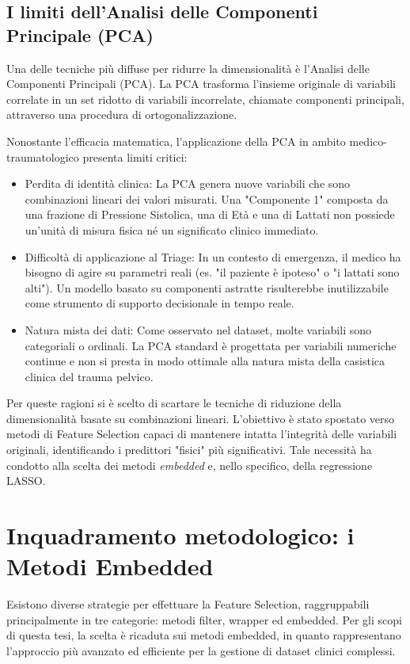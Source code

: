 \documentclass[11pt, oneside, noexaminfo]{sapthesis}   	%
\begin{document}
\subsection{I limiti dell'Analisi delle Componenti Principale (PCA)}
Una delle tecniche più diffuse per ridurre la dimensionalità è l'Analisi delle Componenti Principali (PCA). La PCA trasforma l'insieme originale di variabili correlate in un set ridotto di variabili incorrelate, chiamate componenti principali, attraverso una procedura di ortogonalizzazione.

Nonostante l'efficacia matematica, l'applicazione della PCA in ambito medico-traumatologico presenta limiti critici:
\begin{itemize}
\item {Perdita di identità clinica}: La PCA genera nuove variabili che sono combinazioni lineari dei valori misurati. Una "Componente 1" composta da una frazione di Pressione Sistolica, una di Età e una di Lattati non possiede un'unità di misura fisica né un significato clinico immediato.
\item {Difficoltà di applicazione al Triage}: In un contesto di emergenza, il medico ha bisogno di agire su parametri reali (es. "il paziente è ipoteso" o "i lattati sono alti"). Un modello basato su componenti astratte risulterebbe inutilizzabile come strumento di supporto decisionale in tempo reale.
\item {Natura mista dei dati}: Come osservato nel dataset, molte variabili sono categoriali o ordinali. La PCA standard è progettata per variabili numeriche continue e non si presta in modo ottimale alla natura mista della casistica clinica del trauma pelvico.
\end{itemize}

Per queste ragioni si è scelto di scartare le tecniche di riduzione della dimensionalità basate su combinazioni lineari. L'obiettivo è stato spostato verso metodi di Feature Selection capaci di mantenere intatta l'integrità delle variabili originali, identificando i predittori "fisici" più significativi. Tale necessità ha condotto alla scelta dei metodi \textit{embedded} e, nello specifico, della regressione LASSO.

\section{Inquadramento metodologico: i Metodi Embedded}
Esistono diverse strategie per effettuare la Feature Selection, raggruppabili principalmente in tre categorie: metodi filter, wrapper ed embedded. Per gli scopi di questa tesi, la scelta è ricaduta sui metodi embedded, in quanto rappresentano l'approccio più avanzato ed efficiente per la gestione di dataset clinici complessi.
\end{document}

